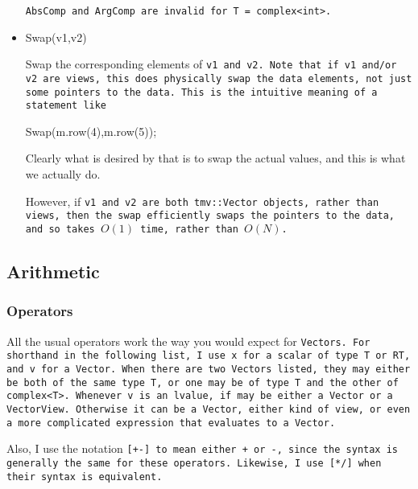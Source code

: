 \begin{itemize}
\tt{AbsComp} and \tt{ArgComp} are invalid for \tt{T = complex<int>}.

\item
\begin{tmvcode}
Swap(v1,v2)
\end{tmvcode}
Swap the corresponding elements of \tt{v1} and \tt{v2}.  Note that if v1 and/or v2 are
views, this does physically
swap the data elements, not just some pointers to the data.  This is the intuitive 
meaning of a statement like
\begin{tmvcode}
Swap(m.row(4),m.row(5));
\end{tmvcode}
Clearly what is desired by that is to swap the actual values, and this is what we actually do.

However, if \tt{v1} and \tt{v2} are both \tt{tmv::Vector} objects, rather than views, then the 
swap efficiently swaps the pointers to the data, and so takes $O(1)$ time, rather than
$O(N)$.

\end{itemize}

\subsection{Arithmetic}
\label{Vector_Arithmetic}

\subsubsection{Operators}

All the usual operators work the way you would expect for \tt{Vector}s.  For shorthand in the 
following list, I use \tt{x} for a scalar of type \tt{T} or \tt{RT}, and
\tt{v} for a \tt{Vector}.  When there are two \tt{Vector}s
listed, they may either be both of the same type \tt{T}, or one may be of type 
\tt{T} and the other of \tt{complex<T>}.  Whenever \tt{v} is an lvalue,
if may be either a \tt{Vector} or a \tt{VectorView}.  Otherwise it can
be a \tt{Vector}, either kind of view, or even a more complicated
expression that evaluates to a \tt{Vector}.

Also, I use the notation \tt{[+-]} to mean either \tt{+} or \tt{-}, since
the syntax is generally the same for these operators.
Likewise, I use \tt{[*/]} when their syntax is equivalent.

